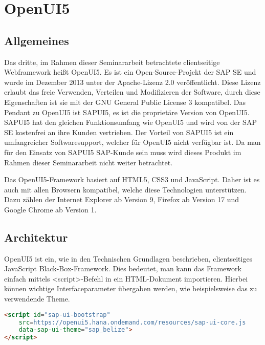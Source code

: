 
\chapter{OpenUI5}
\label{ch:openUI5}

\section{Allgemeines}

Das dritte, im Rahmen dieser Seminararbeit betrachtete clientseitige Webframework heißt OpenUI5. Es ist ein Open-Source-Projekt der SAP SE und wurde im Dezember 2013 unter der Apache-Lizenz 2.0 veröffentlicht. Diese Lizenz erlaubt das freie Verwenden, Verteilen und Modifizieren der Software, durch diese Eigenschaften ist sie mit der GNU General Public License 3 kompatibel. Das Pendant zu OpenUI5 ist SAPUI5, es ist die proprietäre Version von OpenUI5. SAPUI5 hat den gleichen Funktionsumfang wie OpenUI5 und wird von der SAP SE kostenfrei an ihre Kunden vertrieben. Der Vorteil von SAPUI5 ist ein umfangreicher Softwaresupport, welcher für OpenUI5 nicht verfügbar ist. Da man für den Einsatz von SAPUI5 SAP-Kunde sein muss wird dieses Produkt im Rahmen dieser Seminararbeit nicht weiter betrachtet.

Das OpenUI5-Framework basiert auf HTML5, CSS3 und JavaScript. Daher ist es auch mit allen Browsern kompatibel, welche diese Technologien unterstützen. Dazu zählen der Internet Explorer ab Version 9, Firefox ab Version 17 und Google Chrome ab Version 1.\autocites[vgl.][6]{SAP2013}


\section{Architektur}

OpenUI5 ist ein, wie in den Technischen Grundlagen beschrieben, clientseitiges JavaScript Black-Box-Framework. Dies bedeutet, man kann das Framework einfach mittels <script>-Befehl in ein HTML-Dokument importieren. Hierbei können wichtige Interfaceparameter übergaben werden, wie beispielsweise das zu verwendende Theme.

\begin{lstlisting}[caption=Beispiel für das Einbinden von OpenUI5, label=lst:UI5Einbinden, language=HTML]
<script id="sap-ui-bootstrap"
	src=https://openui5.hana.ondemand.com/resources/sap-ui-core.js
	data-sap-ui-theme="sap_belize">
</script>
\end{lstlisting}

